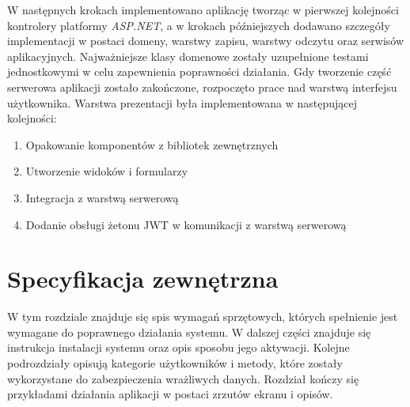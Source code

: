 \documentclass[a4paper,twoside,12pt]{book}
\begin{document}
{	W następnych krokach implementowano aplikację tworząc w pierwszej kolejności kontrolery platformy \textit{ASP.NET}, a w krokach późniejszych dodawano szczegóły implementacji w postaci domeny, warstwy zapisu, warstwy odczytu oraz serwisów aplikacyjnych. Najważniejsze klasy domenowe zostały uzupełnione testami jednostkowymi w celu zapewnienia poprawności działania. Gdy tworzenie część serwerowa aplikacji zostało zakończone, rozpoczęto prace nad warstwą interfejsu użytkownika. Warstwa prezentacji była implementowana w następującej kolejności:
	\begin{enumerate}
		\item Opakowanie komponentów z bibliotek zewnętrznych
		\item Utworzenie widoków i formularzy
		\item Integracja z warstwą serwerową
		\item Dodanie obsługi żetonu JWT w komunikacji z warstwą serwerową
	\end{enumerate}

\chapter{Specyfikacja zewnętrzna}
\label{chap:external}
W tym rozdziale znajduje się spis wymagań sprzętowych, których spełnienie jest wymagane do poprawnego działania systemu. W dalszej części znajduje się instrukcja instalacji systemu oraz opis sposobu jego aktywacji. Kolejne podrozdziały opisują kategorie użytkowników i metody, które zostały wykorzystane do zabezpieczenia wrażliwych danych. Rozdział kończy się przykładami działania aplikacji w postaci zrzutów ekranu i opisów.

}
\end{document}
